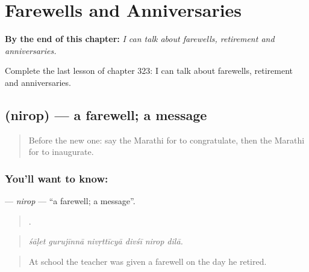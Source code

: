 
\chapter{Farewells and Anniversaries}
\label{ch:mr-farewells-and-anniversaries}

\begin{chapteropening}
\textbf{By the end of this chapter:} \emph{I can talk about farewells, retirement and anniversaries.}

Complete the last lesson of chapter 323: I can talk about farewells, retirement and anniversaries.
\end{chapteropening}

\section[\texorpdfstring{\mr{निरोप} (nirop)}{निरोप (nirop)}]{ (nirop) — a farewell; a message}

\label{lesson:MR-C323-nirop}



\begin{quote}
Before the new one: say the Marathi for to congratulate, then the Marathi for to inaugurate.
\end{quote}

\subsection*{You'll want to know: }
\textbf{} — \emph{nirop} — \textquotedblleft{}a farewell; a message\textquotedblright{}.

\begin{quote}
     .
\end{quote}

\begin{quote}
\emph{śāḷet gurujīnnā nivṛttīcyā divśī nirop dilā.}
\end{quote}

\begin{quote}
At school the teacher was given a farewell on the day he retired.
\end{quote}

